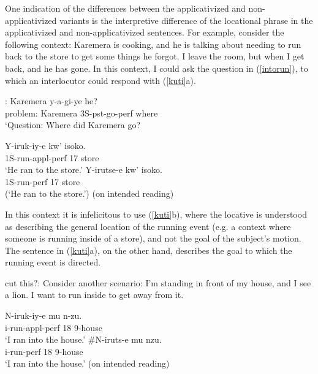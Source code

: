 \documentclass[output=paper]{langsci/langscibook}
\begin{document}
 
 One indication of the differences between the applicativized and non-applicativized variants is the interpretive difference of the locational phrase in the applicativized and non-applicativized sentences. For example, consider the following context: Karemera is cooking, and he is talking about needing to run back to the store to get some things he forgot. I leave the room, but when I get back, and he has gone. In this context, I could ask the question in (\ref{intorun}), to which an interlocutor could respond with (\ref{kuti}a).
	\begin{exe}
		\ex\label{intorun}\gll [Ikibazo]: Karemera y-a-gi-ye he?\\
				problem: Karemera 3S-{\sc pst}-go-{\sc perf} where\\
				\glt `Question: Where did Karemera go? 		
		\ex\label{kuti}\begin{xlist}
			\ex\gll Y-iruk-iy-e kw' isoko.\\
					{\sc 1S-}run-{\sc appl-perf} 17 store\\
					\glt `He ran to the store.' \hfill 
			\ex\gll\odd Y-irutse-e kw' isoko.\\
					{\sc 1S-}run-{\sc perf} 17 store\\
					\glt (`He ran to the store.') (on intended reading)
			\end{xlist}
	\end{exe}
%
In this context it is infelicitous to use (\ref{kuti}b), where the locative is understood as describing the general location of the running event (e.g. a context where someone is running inside of a store), and not the {\sc goal}  of the subject's motion. The sentence in (\ref{kuti}a), on the other hand, describes the {\sc goal}  to which the running event is directed. 

\iffalse
cut this?: Consider another scenario: I'm standing in front of my house, and I see a lion. I want to run inside to get away from it. 

	\begin{exe}
		\ex\label{intorun}\begin{xlist}
			\ex\gll N-iruk-iy-e mu n-zu.\\
					i-run-{\sc appl-perf} 18 9-house\\
					\glt `I ran into the house.'
			\ex\gll \#N-iruts-e mu nzu.\\
					i-run-{\sc perf} 18 9-house\\
					\glt `I ran into the house.'	(on intended reading)				
		\end{xlist}
	\end{exe}
%
\end{document}
